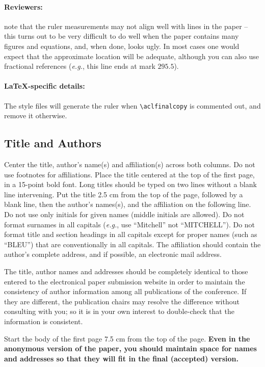 \documentclass[11pt,a4paper]{article}
\begin{document}
\paragraph{Reviewers:}
note that the ruler measurements may not align well with lines in the paper -- this turns out to be very difficult to do well when the paper contains many figures and equations, and, when done, looks ugly.
In most cases one would expect that the approximate location will be adequate, although you can also use fractional references (\emph{e.g.}, this line ends at mark $295.5$).

\paragraph{\LaTeX-specific details:}
The style files will generate the ruler when {\small\verb|\aclfinalcopy|} is commented out, and remove it otherwise.

\subsection{Title and Authors}
\label{ssec:title-authors}

Center the title, author's name(s) and affiliation(s) across both columns.
Do not use footnotes for affiliations.
Place the title centered at the top of the first page, in a 15-point bold font.
Long titles should be typed on two lines without a blank line intervening.
Put the title 2.5 cm from the top of the page, followed by a blank line, then the author's names(s), and the affiliation on the following line.
Do not use only initials for given names (middle initials are allowed).
Do not format surnames in all capitals (\emph{e.g.}, use ``Mitchell'' not ``MITCHELL'').
Do not format title and section headings in all capitals except for proper names (such as ``BLEU'') that are
conventionally in all capitals.
The affiliation should contain the author's complete address, and if possible, an electronic mail address.

The title, author names and addresses should be completely identical to those entered to the electronical paper submission website in order to maintain the consistency of author information among all publications of the conference.
If they are different, the publication chairs may resolve the difference without consulting with you; so it is in your own interest to double-check that the information is consistent.

Start the body of the first page 7.5 cm from the top of the page.
\textbf{Even in the anonymous version of the paper, you should maintain space for names and addresses so that they will fit in the final (accepted) version.}
\end{document}
